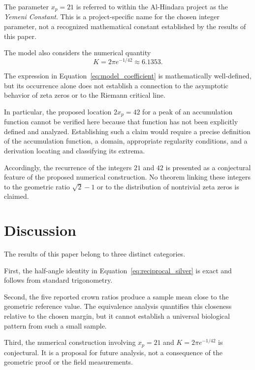 \documentclass[11pt,a4paper]{article}
\begin{document}
The parameter \(x_p=21\) is referred to within the
Al-Hindara project as the \textit{Yemeni Constant}. This
is a project-specific name for the chosen integer parameter,
not a recognized mathematical constant established by
the results of this paper.

The model also considers the numerical quantity
\begin{equation}
    K=2\pi e^{-1/42}\approx6.1353.
    \label{eq:model_coefficient}
\end{equation}

The expression in Equation~\eqref{eq:model_coefficient}
is mathematically well-defined, but its occurrence alone
does not establish a connection to the asymptotic behavior
of zeta zeros or to the Riemann critical line.

In particular, the proposed location \(2x_p=42\) for a peak
of an accumulation function cannot be verified here because
that function has not been explicitly defined and analyzed.
Establishing such a claim would require a precise definition
of the accumulation function, a domain, appropriate
regularity conditions, and a derivation locating and
classifying its extrema.

Accordingly, the recurrence of the integers \(21\) and \(42\)
is presented as a conjectural feature of the proposed
numerical construction. No theorem linking these integers
to the geometric ratio \(\sqrt{2}-1\) or to the distribution
of nontrivial zeta zeros is claimed.

\section{Discussion}

The results of this paper belong to three distinct categories.

First, the half-angle identity in
Equation~\eqref{eq:reciprocal_silver} is exact and follows
from standard trigonometry.

Second, the five reported crown ratios produce a sample mean
close to the geometric reference value. The equivalence
analysis quantifies this closeness relative to the chosen
margin, but it cannot establish a universal biological
pattern from such a small sample.

Third, the numerical construction involving \(x_p=21\) and
\(K=2\pi e^{-1/42}\) is conjectural. It is a proposal for
future analysis, not a consequence of the geometric proof
or the field measurements.
\end{document}
